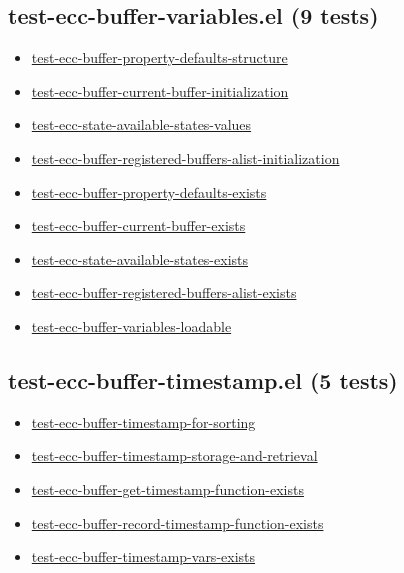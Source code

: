 \documentclass[11pt]{article}
\begin{document}
\subsection{test-ecc-buffer-variables.el (9 tests)}
\label{sec:org5f9f8c5}
\begin{itemize}
\item \href{test-ecc-buffer-variables.el}{test-ecc-buffer-property-defaults-structure}
\item \href{test-ecc-buffer-variables.el}{test-ecc-buffer-current-buffer-initialization}
\item \href{test-ecc-buffer-variables.el}{test-ecc-state-available-states-values}
\item \href{test-ecc-buffer-variables.el}{test-ecc-buffer-registered-buffers-alist-initialization}
\item \href{test-ecc-buffer-variables.el}{test-ecc-buffer-property-defaults-exists}
\item \href{test-ecc-buffer-variables.el}{test-ecc-buffer-current-buffer-exists}
\item \href{test-ecc-buffer-variables.el}{test-ecc-state-available-states-exists}
\item \href{test-ecc-buffer-variables.el}{test-ecc-buffer-registered-buffers-alist-exists}
\item \href{test-ecc-buffer-variables.el}{test-ecc-buffer-variables-loadable}
\end{itemize}
\subsection{test-ecc-buffer-timestamp.el (5 tests)}
\label{sec:orgb6f60a3}
\begin{itemize}
\item \href{test-ecc-buffer-timestamp.el}{test-ecc-buffer-timestamp-for-sorting}
\item \href{test-ecc-buffer-timestamp.el}{test-ecc-buffer-timestamp-storage-and-retrieval}
\item \href{test-ecc-buffer-timestamp.el}{test-ecc-buffer-get-timestamp-function-exists}
\item \href{test-ecc-buffer-timestamp.el}{test-ecc-buffer-record-timestamp-function-exists}
\item \href{test-ecc-buffer-timestamp.el}{test-ecc-buffer-timestamp-vars-exists}
\end{itemize}
\end{document}
